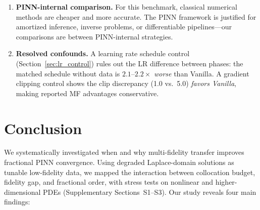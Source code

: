 \documentclass[preprint,12pt]{elsarticle}
\begin{document}
\begin{enumerate}
    \item \textbf{PINN-internal comparison.} For this benchmark, classical numerical methods are cheaper and more accurate. The PINN framework is justified for amortized inference, inverse problems, or differentiable pipelines---our comparisons are between PINN-internal strategies.
    \item \textbf{Resolved confounds.} A learning rate schedule control (Section~\ref{sec:lr_control}) rules out the LR difference between phases: the matched schedule without data is $2.1$--$2.2\times$ \emph{worse} than Vanilla. A gradient clipping control shows the clip discrepancy (1.0 vs.\ 5.0) \emph{favors Vanilla}, making reported MF advantages conservative.
\end{enumerate}

\section{Conclusion}
\label{sec:conclusion}

We systematically investigated when and why multi-fidelity transfer improves fractional PINN convergence. Using degraded Laplace-domain solutions as tunable low-fidelity data, we mapped the interaction between collocation budget, fidelity gap, and fractional order, with stress tests on nonlinear and higher-dimensional PDEs (Supplementary Sections~S1--S3). Our study reveals four main findings:
\end{document}

